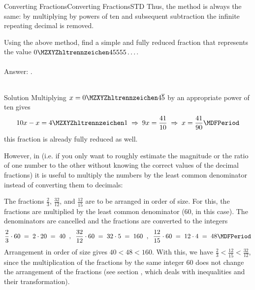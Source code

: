\begin{MXContent}{Converting Fractions}{Converting Fractions}{STD}
Thus, the method is always the same: by multiplying by powers of ten and subsequent 
subtraction the infinite repeating decimal is removed.

\begin{MExercise}
Using the above method, find a simple and fully reduced fraction that represents the
value $\MZahl{0}{45555}\ldots$.
\ \\ \ \\
Answer: .
\ \\
\ \\
\begin{MHint}{Solution}
Multiplying $x=\MZahl{0}{4}\overline{5}$ by an appropriate power of ten gives
$$
10x-x=\MZahl{4}{1}\;\Rightarrow\; 9x=\Mdfrac{41}{10}\;\Rightarrow\;x=\Mdfrac{41}{90} \MDFPeriod
$$
this fraction is already fully reduced as well.
\end{MHint}
\end{MExercise}

However, in  
(i.e. if you only want to roughly estimate the magnitude or the ratio of one number to the other without 
knowing the correct values of the decimal fractions) it is useful to multiply the numbers by the least 
common denominator instead of converting them to decimals:

\begin{MExample}
The fractions $\frac23$, $\frac{32}{12}$, and $\frac{12}{15}$ are to be arranged in order of size.
For this, the fractions are multiplied by the least common denominator ($60$, in this case). 
The denominators are cancelled and the fractions are converted to the integers
$$
\frac23\cdot 60\;=\; 2\cdot 20\;=\; 40 \;\; ,\;\;
\frac{32}{12}\cdot 60 \;=\; 32\cdot 5\;=\; 160 \;\; , \;\;
\frac{12}{15}\cdot 60 \;=\; 12\cdot 4 \;=\; 48 \MDFPeriod
$$
Arrangement in order of size gives $40<48<160$. With this, we have $\frac23<\frac{12}{15}<\frac{32}{12}$, 
since the multiplication of the fractions by the same integer $60$ does not change the arrangement of
the fractions (see section , which deals with inequalities and their 
transformation).
\end{MExample}


\end{MXContent}
